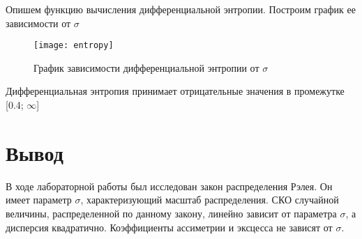 \documentclass[a4paper,14pt]{extarticle}
\begin{document}
Опишем функцию вычисления дифференциальной энтропии. Построим график 
ее зависимости от $\sigma$
\begin{figure}[H]
    \centering
    \texttt{[image: entropy]}
    \caption{График зависимости дифференциальной энтропии от $\sigma$}
    \label{fig:entropy}
\end{figure}

Дифференциальная энтропия принимает отрицательные значения в промежутке [0.4; $\infty$]

\section*{Вывод}
В ходе лабораторной работы был исследован закон распределения Рэлея.
Он имеет параметр $\sigma$, характеризующий масштаб распределения.
СКО случайной величины, распределенной по данному закону, линейно зависит от
параметра $\sigma$, а дисперсия квадратично. Коэффициенты ассиметрии и эксцесса
не зависят от $\sigma$. 
\end{document}
